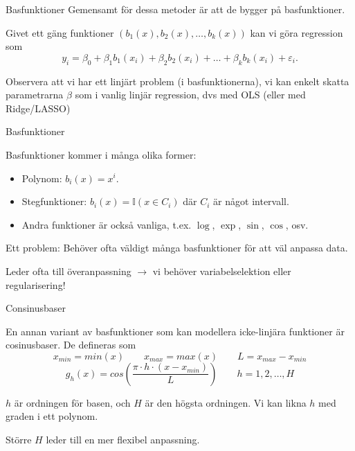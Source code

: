 \documentclass[10pt,english]{beamer}
\begin{document}
\begin{frame}{Basfunktioner}
    Gemensamt för dessa metoder är att de bygger på basfunktioner.

    Givet ett gäng funktioner $(b_1(x), b_2(x), \ldots, b_k(x))$ kan vi göra regression som
    \begin{equation*}
        y_i = \beta_0 + \beta_1 b_1(x_i) + \beta_2 b_2(x_i) + \ldots + \beta_k b_k(x_i) + \varepsilon_i.
    \end{equation*}

    Observera att vi har ett linjärt problem (i basfunktionerna), 
    vi kan enkelt skatta parametrarna $\beta$ som i vanlig linjär regression, dvs med OLS (eller med Ridge/LASSO)

\end{frame}

\begin{frame}{Basfunktioner}

    Basfunktioner kommer i många olika former:
    \begin{itemize}
        \item Polynom: $b_i(x) = x^i$.
        \item Stegfunktioner: $b_i(x) = \mathbb{I}(x \in C_i)$ där $C_i$ är något intervall.
        \item Andra funktioner är också vanliga, t.ex. $\log$, $\exp$, $\sin$, $\cos$, osv.
    \end{itemize}
    
    Ett problem: Behöver ofta väldigt många basfunktioner för att väl anpassa data. 
    
    Leder ofta till överanpassning $\rightarrow$ vi behöver variabelselektion eller regularisering!

\end{frame}


\begin{frame}{Consinusbaser}

En annan variant av basfunktioner som kan modellera icke-linjära funktioner
är cosinusbaser. De defineras som 
\[
x_{min}=min\left(x\right)\qquad x_{max}=max\left(x\right)\qquad L=x_{max}-x_{min}
\]
\begin{equation}
g_{h}\left(x\right)=cos\left(\frac{\pi\cdot h\cdot\left(x-x_{min}\right)}{L}\right)\qquad h=1,2,\ldots,H\label{eq:cosine basis}
\end{equation}

$h$ är ordningen för basen, och $H$ är den högsta ordningen. Vi kan likna $h$ med graden i ett polynom.

Större $H$ leder till en mer flexibel anpassning.

\end{frame}
\end{document}
